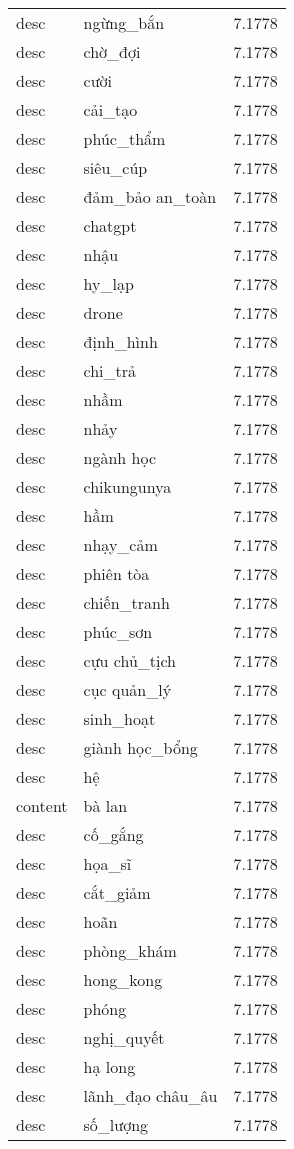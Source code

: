 \documentclass{article}
\begin{document}
\begin{tabular}{lll}
desc & ngừng\_bắn & 7.1778\\
desc & chờ\_đợi & 7.1778\\
desc & cười & 7.1778\\
desc & cải\_tạo & 7.1778\\
desc & phúc\_thẩm & 7.1778\\
desc & siêu\_cúp & 7.1778\\
desc & đảm\_bảo an\_toàn & 7.1778\\
desc & chatgpt & 7.1778\\
desc & nhậu & 7.1778\\
desc & hy\_lạp & 7.1778\\
desc & drone & 7.1778\\
desc & định\_hình & 7.1778\\
desc & chi\_trả & 7.1778\\
desc & nhầm & 7.1778\\
desc & nhảy & 7.1778\\
desc & ngành học & 7.1778\\
desc & chikungunya & 7.1778\\
desc & hầm & 7.1778\\
desc & nhạy\_cảm & 7.1778\\
desc & phiên tòa & 7.1778\\
desc & chiến\_tranh & 7.1778\\
desc & phúc\_sơn & 7.1778\\
desc & cựu chủ\_tịch & 7.1778\\
desc & cục quản\_lý & 7.1778\\
desc & sinh\_hoạt & 7.1778\\
desc & giành học\_bổng & 7.1778\\
desc & hệ & 7.1778\\
content & bà lan & 7.1778\\
desc & cố\_gắng & 7.1778\\
desc & họa\_sĩ & 7.1778\\
desc & cắt\_giảm & 7.1778\\
desc & hoãn & 7.1778\\
desc & phòng\_khám & 7.1778\\
desc & hong\_kong & 7.1778\\
desc & phóng & 7.1778\\
desc & nghị\_quyết & 7.1778\\
desc & hạ long & 7.1778\\
desc & lãnh\_đạo châu\_âu & 7.1778\\
desc & số\_lượng & 7.1778\\

\end{tabular}
\end{document}
